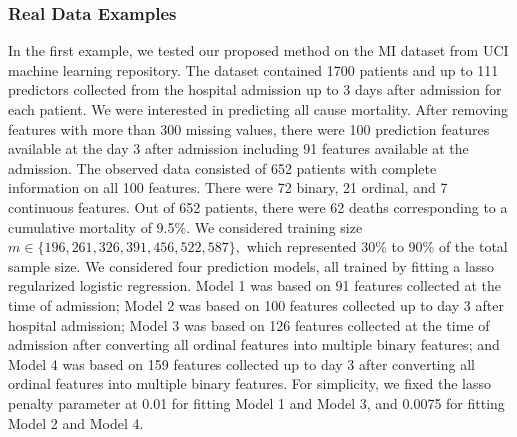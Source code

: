 \documentclass[12pt]{article}
\begin{document}
\subsubsection{Real Data Examples}
In the first example, we tested our proposed method on the MI dataset from UCI machine learning repository. The dataset contained 1700 patients and up to 111 predictors collected from the hospital admission up to 3 days after admission for each patient. We were interested in predicting all cause mortality. After removing features with more than 300 missing values, there were 100 prediction features available at the day 3 after admission including 91 features available at the admission. The observed data consisted of 652 patients with complete information on all 100 features.  There were 72 binary, 21 ordinal, and 7 continuous features. Out of 652 patients, there were 62 deaths corresponding to a cumulative mortality of 9.5\%. We considered training size $m\in \{196, 261, 326, 391, 456, 522, 587\},$ which represented 30\% to 90\% of the total sample size.  We considered four prediction models, all trained by fitting a lasso regularized logistic regression.  Model 1 was based on 91 features collected at the time of admission; Model 2 was based on 100 features collected up to day 3 after hospital admission; Model 3 was based on 126 features collected at the time of admission after converting all ordinal features into multiple binary features;  and Model 4 was based on 159 features collected up to day 3 after converting all ordinal features into multiple binary features. For simplicity, we fixed the lasso penalty parameter at 0.01 for fitting Model 1 and Model 3, and 0.0075 for fitting Model 2 and Model 4.
\end{document}

